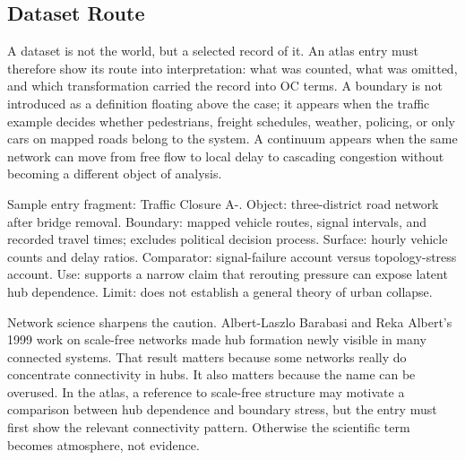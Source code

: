 \documentclass[11pt,a4paper,openany]{book}
\begin{document}
\subsection{Dataset Route}
A dataset is not the world, but a selected record of it. An atlas entry must therefore show its route into interpretation: what was counted, what was omitted, and which transformation carried the record into OC terms. A boundary is not introduced as a definition floating above the case; it appears when the traffic example decides whether pedestrians, freight schedules, weather, policing, or only cars on mapped roads belong to the system. A continuum appears when the same network can move from free flow to local delay to cascading congestion without becoming a different object of analysis. \cite{barabasi_scale_free,may_stability_complexity}\par
Sample entry fragment: Traffic Closure A-. Object: three-district road network after bridge removal. Boundary: mapped vehicle routes, signal intervals, and recorded travel times; excludes political decision process. Surface: hourly vehicle counts and delay ratios. Comparator: signal-failure account versus topology-stress account. Use: supports a narrow claim that rerouting pressure can expose latent hub dependence. Limit: does not establish a general theory of urban collapse.\par
Network science sharpens the caution. Albert-Laszlo Barabasi and Reka Albert's 1999 work on scale-free networks made hub formation newly visible in many connected systems. That result matters because some networks really do concentrate connectivity in hubs. It also matters because the name can be overused. In the atlas, a reference to scale-free structure may motivate a comparison between hub dependence and boundary stress, but the entry must first show the relevant connectivity pattern. Otherwise the scientific term becomes atmosphere, not evidence.\par
\end{document}
